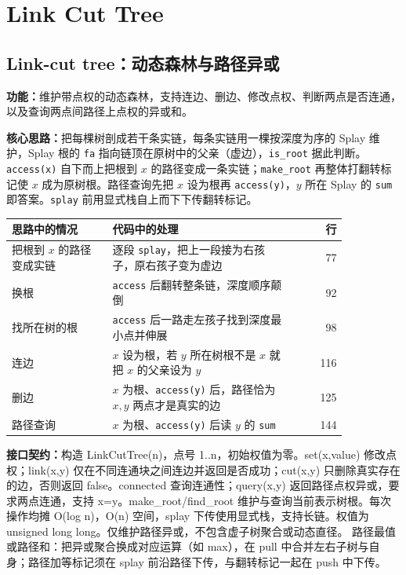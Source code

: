 \section{Link Cut Tree}

\subsection{Link-cut tree：动态森林与路径异或}\label{compact-LinkCutTree}

\noindent\textbf{功能：}\allowbreak 维护带点权的动态森林，支持连边、删边、修改点权、判断两点是否连通，以及查询两点间路径上点权的异或和。

\textbf{核心思路：}\allowbreak 把每棵树剖成若干条实链，每条实链用一棵按深度为序的 Splay 维护，Splay 根的 \texttt{fa} 指向链顶在原树中的父亲（虚边），\texttt{is\_root} 据此判断。\texttt{access(x)} 自下而上把根到 $x$ 的路径变成一条实链；\texttt{make\_root} 再整体打翻转标记使 $x$ 成为原树根。路径查询先把 $x$ 设为根再 \texttt{access(y)}，$y$ 所在 Splay 的 \texttt{sum} 即答案。\texttt{splay} 前用显式栈自上而下下传翻转标记。

\begin{center}\small
\begin{tabular}{@{}p{0.30\linewidth}p{0.55\linewidth}r@{}}
\toprule
思路中的情况 & 代码中的处理 & 行\\
\midrule
把根到 $x$ 的路径变成实链 & 逐段 \texttt{splay}，把上一段接为右孩子，原右孩子变为虚边 & 77\\
换根 & \texttt{access} 后翻转整条链，深度顺序颠倒 & 92\\
找所在树的根 & \texttt{access} 后一路走左孩子找到深度最小点并伸展 & 98\\
连边 & $x$ 设为根，若 $y$ 所在树根不是 $x$ 就把 $x$ 的父亲设为 $y$ & 116\\
删边 & $x$ 为根、\texttt{access(y)} 后，路径恰为 $x,y$ 两点才是真实的边 & 125\\
路径查询 & $x$ 为根、\texttt{access(y)} 后读 $y$ 的 \texttt{sum} & 144\\
\bottomrule
\end{tabular}
\end{center}



{\sloppy{}\noindent\textbf{接口契约：}构造 LinkCutTree(n)，点号 1..n，初始权值为零。set(x,value) 修改点权；link(x,y) 仅在不同连通块之间连边并返回是否成功；cut(x,y) 只删除真实存在的边，否则返回 false。connected 查询连通性；query(x,y) 返回路径点权异或，要求两点连通，支持 x=y。make\_root/find\_root 维护与查询当前表示树根。每次操作均摊 O(log n)，O(n) 空间，splay 下传使用显式栈，支持长链。权值为 unsigned long long。仅维护路径异或，不包含虚子树聚合或动态直径。 路径最值或路径和：把异或聚合换成对应运算（如 max），在 pull 中合并左右子树与自身；路径加等标记须在 splay 前沿路径下传，与翻转标记一起在 push 中下传。\par}

